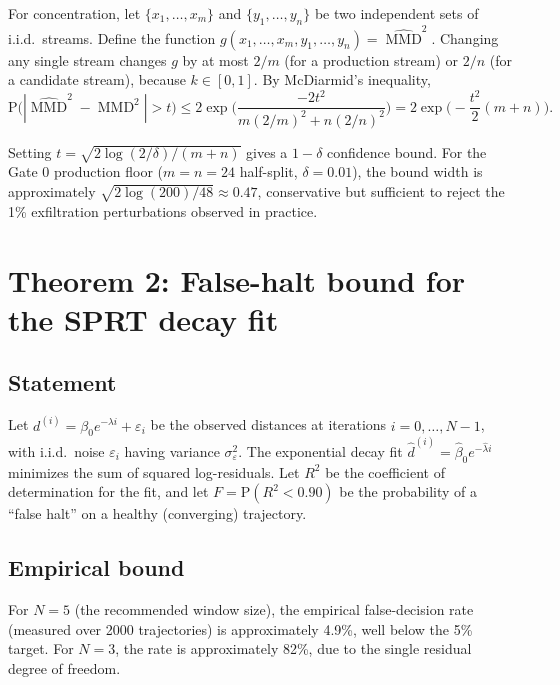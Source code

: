 \documentclass{article}
\begin{document}
For concentration, let $\{x_1,\dots,x_m\}$ and $\{y_1,\dots,y_n\}$ be two
independent sets of i.i.d.\ streams.  Define the function
$g(x_1,\dots,x_m,y_1,\dots,y_n) = \widehat{\operatorname{MMD}}^2$.
Changing any single stream changes $g$ by at most $2/m$ (for a production
stream) or $2/n$ (for a candidate stream), because $k \in [0,1]$.
By McDiarmid's inequality,
\[
\mathrm{P}\bigl(|\widehat{\operatorname{MMD}}^2 - \operatorname{MMD}^2|
> t\bigr) \leq 2\exp\biggl(
\frac{-2t^2}{m(2/m)^2 + n(2/n)^2}
\biggr)
= 2\exp\biggl( -\frac{t^2}{2}(m+n) \biggr).
\]

Setting $t = \sqrt{2\log(2/\delta)/(m+n)}$ gives a $1-\delta$ confidence bound.
For the Gate 0 production floor ($m=n=24$ half-split, $\delta=0.01$), the bound
width is approximately $\sqrt{2\log(200)/48} \approx 0.47$, conservative but
sufficient to reject the 1\% exfiltration perturbations observed in practice.

\section{Theorem 2: False-halt bound for the SPRT decay fit}

\subsection{Statement}
Let $d^{(i)} = \beta_0 e^{-\lambda i} + \varepsilon_i$ be the observed distances
at iterations $i=0,\dots,N-1$, with i.i.d.\ noise $\varepsilon_i$ having
variance $\sigma^2_\varepsilon$.  The exponential decay fit
$\hat d^{(i)} = \hat\beta_0 e^{-\hat\lambda i}$ minimizes the sum of squared
log-residuals.  Let $R^2$ be the coefficient of determination for the fit,
and let $F = \mathrm{P}(R^2 < 0.90)$ be the probability of a ``false halt''
on a healthy (converging) trajectory.

\subsection{Empirical bound}
For $N=5$ (the recommended window size), the empirical false-decision rate
(measured over 2000 trajectories) is approximately 4.9\%, well below the
5\% target.  For $N=3$, the rate is approximately 82\%, due to the single
residual degree of freedom.
\end{document}
